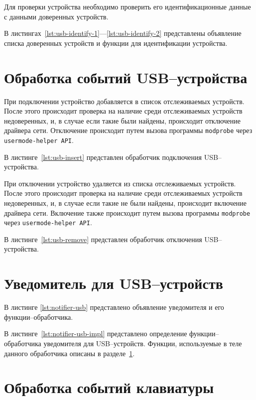 Для проверки устройства необходимо проверить его идентификационные данные с данными доверенных устройств. 

В листингах~\ref{lst:usb-identify-1}---\ref{lst:usb-identify-2} представлены объявление списка доверенных устройств и функции для идентификации устройства.

\section{Обработка событий USB--устройства}
\label{sect:usb-not}

При подключении устройство добавляется в список отслеживаемых устройств. После этого происходит проверка на наличие среди отслеживаемых устройств недоверенных, и, в случае если такие были найдены, происходит отключение драйвера сети. Отключение происходит путем вызова программы \texttt{modprobe} через \texttt{usermode-helper API}.

В листинге~\ref{lst:usb-insert} представлен обработчик подключения USB--устройства.

При отключении устройство удаляется из списка отслеживаемых устройств. После этого происходит проверка на наличие среди отслеживаемых устройств недоверенных, и, в случае если такие не были найдены, происходит включение драйвера сети. Включение также происходит путем вызова программы \texttt{modprobe} через \texttt{usermode-helper API}.

В листинге~\ref{lst:usb-remove} представлен обработчик отключения USB--устройства.

\section{Уведомитель для USB--устройств}

В листинге \ref{lst:notifier-usb} представлено объявление уведомителя и его функции--обработчика.


В листинге~\ref{lst:notifier-usb-impl} представлено определение функции--обработчика уведомителя для USB--устройств. Функции, используемые в теле данного обработчика описаны в разделе~\ref{sect:usb-not}.

\clearpage


\section{Обработка событий клавиатуры}
\label{sect:kbd-not}

